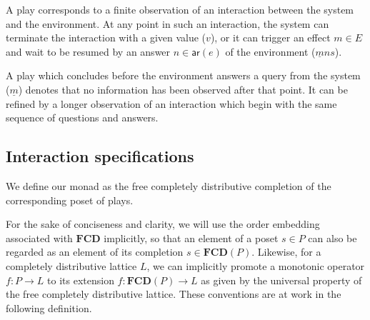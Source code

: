 \documentclass[sigplan,screen]{acmart}
\newcommand{\kw}[1]{\ensuremath{ \mathsf{#1} }}
\begin{document}
A play corresponds to a finite observation of
an interaction between the system and the environment.
At any point in such an interaction,
the system can terminate the interaction with a given value ($v$),
or it can trigger an effect $m \in E$ and
wait to be resumed by
an answer $n \in \kw{ar}(e)$ of the environment
($\underline{m} n s$).

A play which concludes before
the environment answers a query from the system ($\underline{m}$)
denotes that no information has been observed after that point.
It can be refined by a longer observation
of an interaction which begin with the same sequence of
questions and answers.


\subsection{Interaction specifications} %

We define our monad as the free completely distributive completion
of the corresponding poset of plays.

For the sake of conciseness and clarity,
we will use the order embedding associated with $\mathbf{FCD}$
implicitly,
so that an element of a poset $s \in P$
can also be regarded as an element of
its completion $s \in \mathbf{FCD}(P)$.
Likewise,
for a completely distributive lattice $L$,
we can implicitly
promote a monotonic operator
$f : P \rightarrow L$
to its extension
$f : \mathbf{FCD}(P) \rightarrow L$
as given by the universal property of
the free completely distributive lattice.
These conventions are at work
in the following definition.
\end{document}
